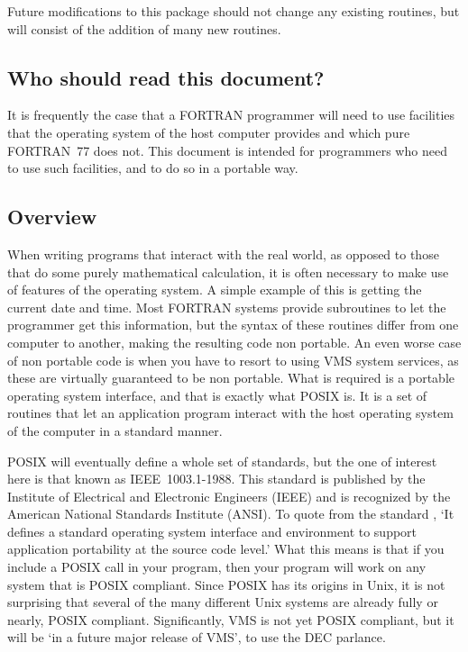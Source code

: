 Future modifications to this package should not change any existing routines,
but will consist of the addition of many new routines.

\subsection{Who should read this document?}

It is frequently the case that a FORTRAN programmer will need to use facilities
that the operating system of the host computer provides and which pure
FORTRAN~77 does not.  This document is intended for programmers who need to use
such facilities, and to do so in a portable way.

\subsection{Overview}

When writing programs that interact with the real world, as opposed to those
that do some purely mathematical calculation, it is often necessary to make use
of features of the operating system. A simple example of this is getting the
current date and time. Most FORTRAN systems provide subroutines to let the
programmer get this information, but the syntax of these routines differ from
one computer to another, making the resulting code non portable. An even worse
case of non portable code is when you have to resort to using VMS system
services, as these are virtually guaranteed to be non portable. What is
required is a portable operating system interface, and that is exactly what
POSIX is. It is a set of routines that let an application program interact with
the host operating system of the computer in a standard manner. 

POSIX will eventually define a whole set of standards, but the one of interest
here is that known as IEEE~1003.1-1988. This standard is published by the
Institute of Electrical and Electronic Engineers (IEEE) and is recognized by
the American National Standards Institute (ANSI). To quote from the standard
\cite{psx:std}, `It defines a standard operating system interface and
environment to support application portability at the source code level.' What
this means is that if you include a POSIX call in your program, then your
program will work on any system that is POSIX compliant. Since POSIX has its
origins in Unix, it is not surprising that several of the many different Unix
systems are already fully or nearly, POSIX compliant. Significantly, VMS is not
yet POSIX compliant, but it will be `in a future major release of VMS', to use
the DEC parlance. 

